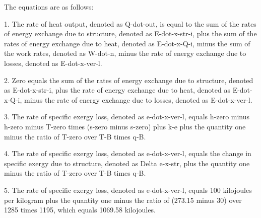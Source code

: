 The equations are as follows:

1. The rate of heat output, denoted as Q-dot-out, is equal to the sum of the rates of energy exchange due to structure, denoted as E-dot-x-str-i, plus the sum of the rates of energy exchange due to heat, denoted as E-dot-x-Q-i, minus the sum of the work rates, denoted as W-dot-n, minus the rate of energy exchange due to losses, denoted as E-dot-x-ver-l.

2. Zero equals the sum of the rates of energy exchange due to structure, denoted as E-dot-x-str-i, plus the rate of energy exchange due to heat, denoted as E-dot-x-Q-i, minus the rate of energy exchange due to losses, denoted as E-dot-x-ver-l.

3. The rate of specific exergy loss, denoted as e-dot-x-ver-l, equals h-zero minus h-zero minus T-zero times (s-zero minus s-zero) plus k-e plus the quantity one minus the ratio of T-zero over T-B times q-B.

4. The rate of specific exergy loss, denoted as e-dot-x-ver-l, equals the change in specific exergy due to structure, denoted as Delta e-x-str, plus the quantity one minus the ratio of T-zero over T-B times q-B.

5. The rate of specific exergy loss, denoted as e-dot-x-ver-l, equals 100 kilojoules per kilogram plus the quantity one minus the ratio of (273.15 minus 30) over 1285 times 1195, which equals 1069.58 kilojoules.